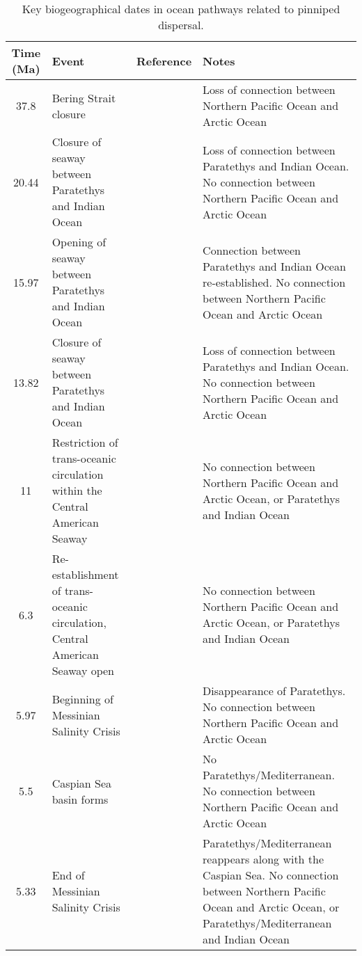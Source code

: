 \begin{longtable}{cp{}p{}p{}}

\caption{Key biogeographical dates in ocean pathways related to pinniped dispersal.}\\

\hline
\textbf{Time (Ma)} & \textbf{Event} & \textbf{Reference} & \textbf{Notes}\\
\hline
37.8 &
Bering Strait closure &
\cite{gladenkov2002refined} &
Loss of connection between Northern Pacific Ocean and Arctic Ocean \\
20.44 &
Closure of seaway between Paratethys and Indian Ocean &
\cite{rogl1999mediterranean} &
Loss of connection between Paratethys and Indian Ocean. No connection between Northern Pacific Ocean and Arctic Ocean \\  
15.97 &
Opening of seaway between Paratethys and Indian Ocean &
\cite{rogl1999mediterranean} &
Connection between Paratethys and Indian Ocean re-established. No connection between Northern Pacific Ocean and Arctic Ocean\\
13.82 &
Closure of seaway between Paratethys and Indian Ocean &
\cite{rogl1999mediterranean} &
Loss of connection between Paratethys and Indian Ocean. No connection between Northern Pacific Ocean and Arctic Ocean \\
11 &
Restriction of trans-oceanic circulation within the Central American Seaway &
\cite{duque1990neogene} &
No connection between Northern Pacific Ocean and Arctic Ocean, or Paratethys and Indian Ocean \\
6.3 &
Re-establishment of trans-oceanic circulation, Central American Seaway open &
\cite{duque1990neogene} &
No connection between Northern Pacific Ocean and Arctic Ocean, or Paratethys and Indian Ocean \\
5.97 &
Beginning of Messinian Salinity Crisis &
\cite{manzi2018onset, micallef2018evidence} &
Disappearance of Paratethys. No connection between Northern Pacific Ocean and Arctic Ocean \\
5.5 &
Caspian Sea basin forms &
\cite{kazmin2011} &
No Paratethys/Mediterranean. No connection between Northern Pacific Ocean and Arctic Ocean \\
5.33 &
End of Messinian Salinity Crisis &
\cite{manzi2018onset, micallef2018evidence} &
Paratethys/Mediterranean reappears along with the Caspian Sea. No connection between Northern Pacific Ocean and Arctic Ocean, or Paratethys/Mediterranean and Indian Ocean \\

\end{longtable}
